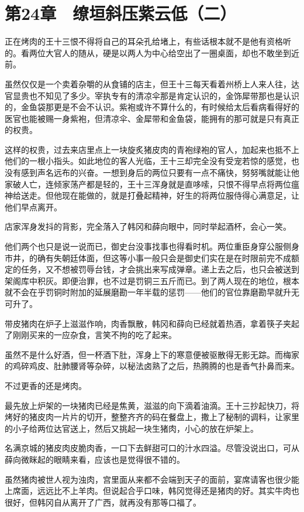 \section{第24章　缭垣斜压紫云低（二）}

正在烤肉的王十三恨不得将自己的耳朵孔给堵上，有些话根本就不是他有资格听的。看两位大官人的随从，硬是以两人为中心给空出了一圈桌面，却也不敢坐到近前。

虽然仅仅是一个卖着杂嚼的从食铺的店主，但王十三每天看着州桥上人来人往，达官显贵也不知见了多少。宰执专有的清凉伞那是肯定认识的，金饰犀带那也是认识的，金鱼袋那更是不会不认识。紫袍或许不算什么的，有时候给太后看病看得好的医官也能被赐一身紫袍，但清凉伞、金犀带和金鱼袋，能拥有的那可就是只有真正的权贵。

这样的权贵，过去来店里点上一块旋炙猪皮肉的青袍绿袍的官人，加起来也抵不上他们的一根小指头。如此地位的客人光临，王十三却完全没有受宠若惊的感觉，也没有感到声名远布的兴奋。一想到身后的两位只要有一点不痛快，努努嘴就能让他家破人亡，连倾家荡产都是轻的，王十三浑身就是直哆嗦，只恨不得早点将两位瘟神给送走。但他现在能做的，就是打叠起精神，好生的将两位服侍得心满意足，让他们早点离开。

店家浑身发抖的背影，完全落入了韩冈和薛向眼中，同时举起酒杯，会心一笑。

他们两个也只是说一说而已，御史台没事找事也得看时机。两位重臣身穿公服侧身市井，的确有失朝廷体面，但这等小事一般只会是御史们实在是在时限前完不成额定的任务，又不想被罚辱台钱，才会挑出来写成弹章。递上去之后，也只会被送到架阁库中积灰。即便治罪，也不过是罚铜三五斤而已。到了两人现在的地位，根本就不会在乎罚铜时附加的延展磨勘一年半载的惩罚——他们的官位靠磨勘早就升无可升了。

带皮猪肉在炉子上滋滋作响，肉香飘散，韩冈和薛向已经就着热酒，拿着筷子夹起了刚刚买来的一应杂食，言笑不拘的吃了起来。

虽然不是什么好酒，但一杯酒下肚，浑身上下的寒意便被驱散得无影无踪。而梅家的鸡碎鸡皮、肚肺腰肾等杂碎，以秘法卤熟了之后，热腾腾的也是香气扑鼻而来。

不过更香的还是烤肉。

最先放上炉架的一块猪肉已经是焦黄，滋滋的向下滴着油滴。王十三抄起快刀，将烤好的猪皮肉一片片的切开，整整齐齐的码在餐盘上，撒上了秘制的调料，让家里的小子给两位达官送上，然后又挑起一块生猪肉，小心的放在炉架上。

名满京城的猪皮肉皮脆肉香，一口下去鲜甜可口的汁水四溢。尽管没说出口，可从薛向微眯起的眼睛来看，应该也是觉得很不错的。

虽然猪肉被世人视为浊肉，宫里面从来都不会端到天子的面前，宴席请客也很少能上席面，远远比不上羊肉。但说起合乎口味，韩冈觉得还是猪肉的好。其实牛肉也很好，但韩冈自从离开了广西，就再没有那等口福了。

